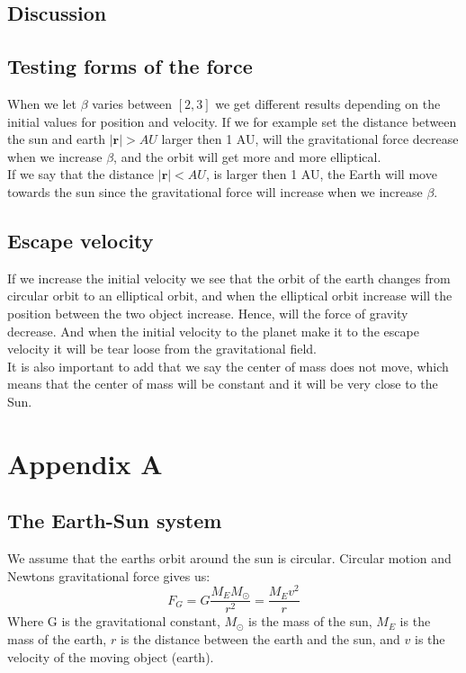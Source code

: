 \documentclass{article}
\begin{document}
\begin{multicols}{2}
\section{Discussion}
\subsection{Testing forms of the force}
When we let $\beta$ varies between $[2,3]$ we get different results depending on the initial values for position and velocity. If we for example set the distance between the sun and earth $|\mathbf{r}|>AU$ larger then 1 AU, will the gravitational force decrease when we increase $\beta$, and the orbit will get more and more elliptical. \\
If we say that the distance $|\mathbf{r}|<AU$, is larger then 1 AU, the Earth will move towards the sun since the gravitational force will increase when we increase $\beta$.    
\subsection{Escape velocity}
If we increase the initial velocity we see that the orbit of the earth changes from circular orbit to an elliptical orbit, and when the elliptical orbit increase will the position between the two object increase. Hence, will the force of gravity decrease. And when the initial velocity to the planet make it to the escape velocity it will be tear loose from the gravitational field.\\
It is also important to add that we say the center of mass does not move, which means that the center of mass will be constant and it will be very close to the Sun.  


\end{multicols}

\clearpage

\appendix \section{Appendix A} %
\subsection{The Earth-Sun system}
We assume that the earths orbit around the sun is circular. Circular motion and Newtons gravitational force gives us:
\begin{equation}
    F_G=G\frac{M_EM_{\odot}}{r^2}=\frac{M_Ev^2}{r}
    \label{eq:G}
\end{equation}
Where G is the gravitational constant, $M_\odot$ is the mass of the sun, $M_E$ is the mass of the earth, $r$ is the distance between the earth and the sun, and $v$ is the velocity of the moving object (earth). 
\end{document}

